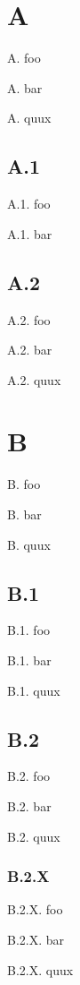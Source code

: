 \documentclass[11pt]{article}
\begin{document}
    \section{A}

    A. foo

    A. bar

    A. quux

    \subsection{A.1}

    A.1. foo

    A.1. bar

    \subsection{A.2}

    A.2. foo

    A.2. bar

    A.2. quux

    \section{B}

    B. foo

    B. bar

    B. quux

    \subsection{B.1}

    B.1. foo

    B.1. bar

    B.1. quux

    \subsection{B.2}

    B.2. foo

    B.2. bar

    B.2. quux

    \subsubsection{B.2.X}

    B.2.X. foo

    B.2.X. bar

    B.2.X. quux
\end{document}
